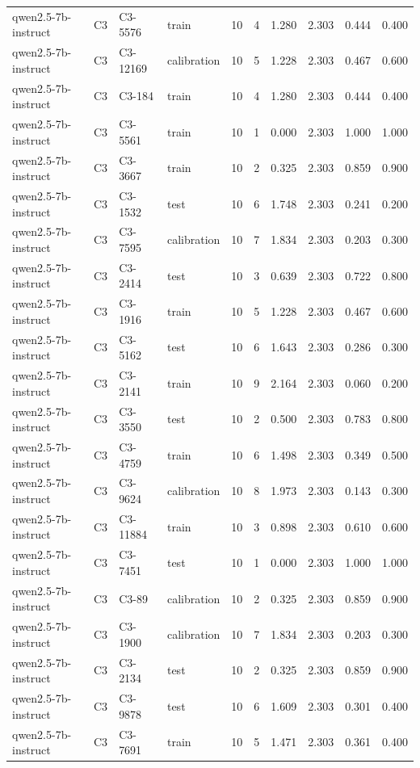 \begin{table}
\begin{tabular}{llllrrrrrr}
qwen2.5-7b-instruct & C3 & C3-5576 & train & 10 & 4 & 1.280 & 2.303 & 0.444 & 0.400 \\
qwen2.5-7b-instruct & C3 & C3-12169 & calibration & 10 & 5 & 1.228 & 2.303 & 0.467 & 0.600 \\
qwen2.5-7b-instruct & C3 & C3-184 & train & 10 & 4 & 1.280 & 2.303 & 0.444 & 0.400 \\
qwen2.5-7b-instruct & C3 & C3-5561 & train & 10 & 1 & 0.000 & 2.303 & 1.000 & 1.000 \\
qwen2.5-7b-instruct & C3 & C3-3667 & train & 10 & 2 & 0.325 & 2.303 & 0.859 & 0.900 \\
qwen2.5-7b-instruct & C3 & C3-1532 & test & 10 & 6 & 1.748 & 2.303 & 0.241 & 0.200 \\
qwen2.5-7b-instruct & C3 & C3-7595 & calibration & 10 & 7 & 1.834 & 2.303 & 0.203 & 0.300 \\
qwen2.5-7b-instruct & C3 & C3-2414 & test & 10 & 3 & 0.639 & 2.303 & 0.722 & 0.800 \\
qwen2.5-7b-instruct & C3 & C3-1916 & train & 10 & 5 & 1.228 & 2.303 & 0.467 & 0.600 \\
qwen2.5-7b-instruct & C3 & C3-5162 & test & 10 & 6 & 1.643 & 2.303 & 0.286 & 0.300 \\
qwen2.5-7b-instruct & C3 & C3-2141 & train & 10 & 9 & 2.164 & 2.303 & 0.060 & 0.200 \\
qwen2.5-7b-instruct & C3 & C3-3550 & test & 10 & 2 & 0.500 & 2.303 & 0.783 & 0.800 \\
qwen2.5-7b-instruct & C3 & C3-4759 & train & 10 & 6 & 1.498 & 2.303 & 0.349 & 0.500 \\
qwen2.5-7b-instruct & C3 & C3-9624 & calibration & 10 & 8 & 1.973 & 2.303 & 0.143 & 0.300 \\
qwen2.5-7b-instruct & C3 & C3-11884 & train & 10 & 3 & 0.898 & 2.303 & 0.610 & 0.600 \\
qwen2.5-7b-instruct & C3 & C3-7451 & test & 10 & 1 & 0.000 & 2.303 & 1.000 & 1.000 \\
qwen2.5-7b-instruct & C3 & C3-89 & calibration & 10 & 2 & 0.325 & 2.303 & 0.859 & 0.900 \\
qwen2.5-7b-instruct & C3 & C3-1900 & calibration & 10 & 7 & 1.834 & 2.303 & 0.203 & 0.300 \\
qwen2.5-7b-instruct & C3 & C3-2134 & test & 10 & 2 & 0.325 & 2.303 & 0.859 & 0.900 \\
qwen2.5-7b-instruct & C3 & C3-9878 & test & 10 & 6 & 1.609 & 2.303 & 0.301 & 0.400 \\
qwen2.5-7b-instruct & C3 & C3-7691 & train & 10 & 5 & 1.471 & 2.303 & 0.361 & 0.400 \\

\end{tabular}
\end{table}
